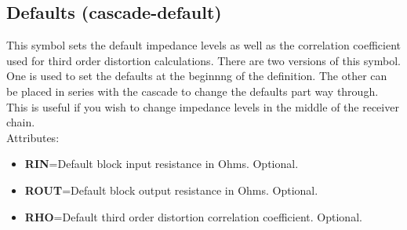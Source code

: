 \documentclass{article}
\begin{document}
\subsection{Defaults (cascade-default)}
This symbol sets the default impedance levels as well as the
correlation coefficient used for third order distortion calculations.
There are two versions of this symbol.  One is used to set the
defaults at the beginnng of the definition.  The other can be placed
in series with the cascade to change the defaults part way through.
This is useful if you wish to change impedance levels in the middle of
the receiver chain. \\
Attributes:
\begin{itemize}
\item {\bf RIN}=Default block input resistance in Ohms.  Optional.
\item {\bf ROUT}=Default block output resistance in Ohms.  Optional.
\item {\bf RHO}=Default third order distortion correlation
  coefficient.  Optional.
\end{itemize}
\end{document}
